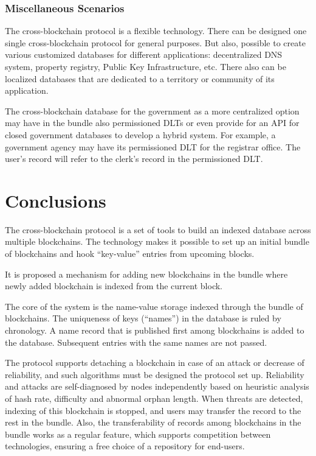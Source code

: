 \begin{multicols}{2}
\subsubsection{Miscellaneous Scenarios}\label{subsubsec-5.2.4}

The cross-blockchain protocol is a flexible technology. There can be designed one single cross-blockchain protocol for general purposes. But also, possible to create various customized databases for different applications: decentralized DNS system, property registry, Public Key Infrastructure, etc. There also can be localized databases that are dedicated to a territory or community of its application.

The cross-blockchain database for the government as a more centralized option may have in the bundle also permissioned DLTs or even provide for an API for closed government databases to develop a hybrid system. For example, a government agency may have its permissioned DLT for the registrar office. The user’s record will refer to the clerk’s record in the permissioned DLT.

\section{Conclusions}\label{sec-6}

The cross-blockchain protocol is a set of tools to build an indexed database across multiple blockchains. The technology makes it possible to set up an initial bundle of blockchains and hook “key-value” entries from upcoming blocks.

It is proposed a mechanism for adding new blockchains in the bundle where newly added blockchain is indexed from the current block.

The core of the system is the name-value storage indexed through the bundle of blockchains. The uniqueness of keys (“names”) in the database is ruled by chronology. A name record that is published first among blockchains is added to the database. Subsequent entries with the same names are not passed.

The protocol supports detaching a blockchain in case of an attack or decrease of reliability, and such algorithms must be designed the protocol set up. Reliability and attacks are self-diagnosed by nodes independently based on heuristic analysis of hash rate, difficulty and abnormal orphan length. When threats are detected, indexing of this blockchain is stopped, and users may transfer the record to the rest in the bundle. Also, the transferability of records among blockchains in the bundle works as a regular feature, which supports competition between technologies, ensuring a free choice of a repository for end-users.


\end{multicols}
